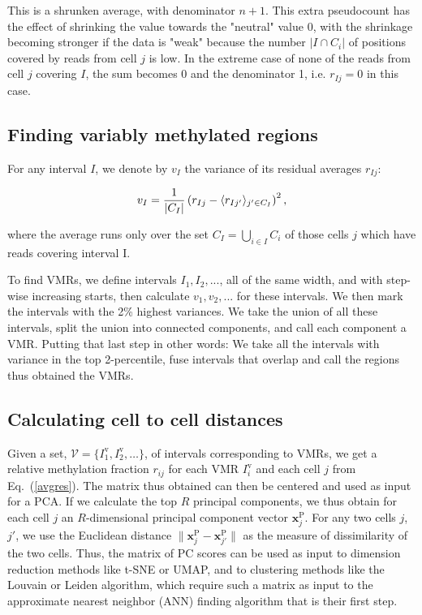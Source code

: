 \documentclass[twocolumn,10pt]{article}
\begin{document}
This is a shrunken average, with denominator $n+1$. This extra pseudocount has the effect of shrinking the value towards the "neutral" value 0, with the shrinkage becoming stronger if the data is "weak" because the number $|I\cap C_i|$ of positions covered by reads from cell $j$  is low. In the extreme case of none of the reads from cell $j$ covering $I$, the sum becomes 0 and the denominator 1, i.e. $r_{Ij}=0$ in this case.

\subsection{Finding variably methylated regions}

For any interval $I$, we denote by $v_I$ the variance of its residual averages $r_{Ij}$:

$$ v_I = \frac{\scriptsize{1}}{\scriptsize{|C_I|}}\left( r_{Ij} - \langle r_{Ij'}\rangle_{j'\in C_I} \right)^2,$$

where the average runs only over the set $C_I=\bigcup_{i\in I}C_i$ of those cells $j$ which have reads covering interval I.

To find VMRs, we define intervals $I_1, I_2, ...$, all of the same width, and with step-wise increasing starts, then calculate $v_1, v_2, ...$ for these intervals. We then mark the intervals with the 2\% highest variances. We take the union of all these intervals, split the union into connected components, and call each component a VMR. Putting that last step in other words: We take all the intervals with variance in the top 2-percentile, fuse intervals that overlap and call the regions thus obtained the VMRs.

\subsection{Calculating cell to cell distances}

Given a set, $\mathcal{V}=\{I^\text{v}_1,I^\text{v}_2,\dots\}$, of intervals corresponding to VMRs, we get a relative methylation fraction $r_{ij}$ for each VMR $I^\text{v}_i$ and each cell $j$ from Eq.\ (\ref{avgres}). The matrix thus obtained can then be centered and used as input for a PCA. If we calculate the top $R$ principal components, we thus obtain for each cell $j$ an $R$-dimensional principal component vector $\mathbf{x}^\text{P}_j$. For any two cells $j$, $j'$, we use the Euclidean distance $\|\mathbf{x}^\text{P}_j - \mathbf{x}^\text{P}_{j'}\|$ as the measure of dissimilarity of the two cells.
Thus, the matrix of PC scores can be used as input to dimension reduction methods like t-SNE or UMAP, and to clustering methods like the Louvain or Leiden algorithm, which require such a matrix as input to the approximate nearest neighbor (ANN) finding algorithm that is their first step.
\end{document}
